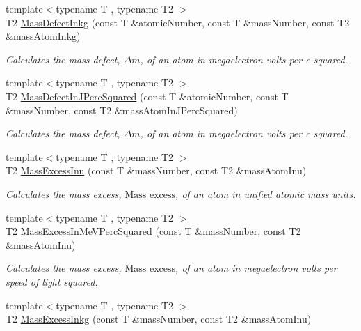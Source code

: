 \begin{DoxyCompactItemize}
{\footnotesize template$<$typename T , typename T2 $>$ }\\T2 \mbox{\hyperlink{group___e_g_x_phys-_mass_defect_gad5378933021e13598a76bd8581b1e887}{Mass\+Defect\+Inkg}} (const T \&atomic\+Number, const T \&mass\+Number, const T2 \&mass\+Atom\+Inkg)
\begin{DoxyCompactList}\small\item\em Calculates the mass defect, $\Delta m$, of an atom in megaelectron volts per c squared. \end{DoxyCompactList}\item 
{\footnotesize template$<$typename T , typename T2 $>$ }\\T2 \mbox{\hyperlink{group___e_g_x_phys-_mass_defect_ga08cff1dfa3259af8f1b67ec741796e91}{Mass\+Defect\+In\+J\+Perc\+Squared}} (const T \&atomic\+Number, const T \&mass\+Number, const T2 \&mass\+Atom\+In\+J\+Perc\+Squared)
\begin{DoxyCompactList}\small\item\em Calculates the mass defect, $\Delta m$, of an atom in megaelectron volts per c squared. \end{DoxyCompactList}\item 
{\footnotesize template$<$typename T , typename T2 $>$ }\\T2 \mbox{\hyperlink{group___e_g_x_phys-_mass_excess_ga61c6f557bd742126c0c76e88cf7740ad}{Mass\+Excess\+Inu}} (const T \&mass\+Number, const T2 \&mass\+Atom\+Inu)
\begin{DoxyCompactList}\small\item\em Calculates the mass excess, $\text{Mass excess}$, of an atom in unified atomic mass units. \end{DoxyCompactList}\item 
{\footnotesize template$<$typename T , typename T2 $>$ }\\T2 \mbox{\hyperlink{group___e_g_x_phys-_mass_excess_ga99a93b88df3425b7a153c32c05fa5a88}{Mass\+Excess\+In\+Me\+V\+Perc\+Squared}} (const T \&mass\+Number, const T2 \&mass\+Atom\+Inu)
\begin{DoxyCompactList}\small\item\em Calculates the mass excess, $\text{Mass excess}$, of an atom in megaelectron volts per speed of light squared. \end{DoxyCompactList}\item 
{\footnotesize template$<$typename T , typename T2 $>$ }\\T2 \mbox{\hyperlink{group___e_g_x_phys-_mass_excess_gab72a3640886092be8b9c9662020a2306}{Mass\+Excess\+Inkg}} (const T \&mass\+Number, const T2 \&mass\+Atom\+Inu)

\end{DoxyCompactItemize}
